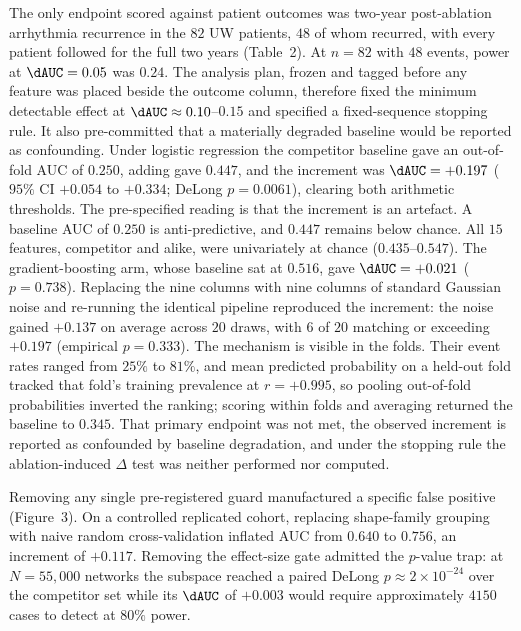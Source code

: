 The only endpoint scored against patient outcomes was two-year post-ablation
arrhythmia recurrence in the $82$ UW patients, $48$ of whom recurred, with every
patient followed for the full two years (Table~2). At $n=82$ with $48$ events,
power at $\dAUC=0.05$ was $0.24$. The analysis plan, frozen and tagged before any
feature was placed beside the outcome column, therefore fixed the minimum
detectable effect at $\dAUC\approx0.10$--$0.15$ and specified a fixed-sequence
stopping rule. It also pre-committed that a materially degraded baseline would be
reported as confounding. Under logistic
regression the competitor baseline gave an out-of-fold AUC of $0.250$, adding
\SFI{} gave $0.447$, and the increment was $\dAUC=+0.197$ ($95\%$ CI $+0.054$ to
$+0.334$; DeLong $p=0.0061$), clearing both arithmetic thresholds. The
pre-specified reading is that the increment is an artefact. A baseline AUC of
$0.250$ is anti-predictive, and $0.447$ remains below chance. All $15$ features,
competitor and \SFI{} alike, were univariately at chance ($0.435$--$0.547$). The
gradient-boosting arm, whose baseline sat at $0.516$, gave $\dAUC=+0.021$
($p=0.738$). Replacing the nine \SFI{} columns with nine columns of standard
Gaussian noise and re-running the identical pipeline reproduced the increment:
the noise gained $+0.137$ on
average across $20$ draws, with $6$ of $20$ matching or exceeding $+0.197$
(empirical $p=0.333$). The mechanism is visible in the folds. Their event rates
ranged from $25\%$ to $81\%$, and mean predicted probability on a held-out fold
tracked that fold's training prevalence at $r=+0.995$, so pooling out-of-fold
probabilities inverted the ranking; scoring within folds and averaging returned
the baseline to $0.345$. That primary endpoint was not met, the
observed increment is reported as confounded by baseline degradation, and under
the stopping rule the ablation-induced $\Delta$\SFI{} test was neither performed
nor computed.

Removing any single pre-registered guard manufactured a specific false positive
(Figure~3). On a controlled replicated cohort, replacing shape-family grouping
with naive random cross-validation inflated AUC from $0.640$ to $0.756$, an
increment of $+0.117$. Removing the effect-size gate admitted the $p$-value trap: at
$N=55{,}000$ networks the subspace \SFI{} reached a paired DeLong
$p\approx2\times10^{-24}$ over the competitor set while its $\dAUC$ of $+0.003$
would require approximately $4150$ cases to detect at $80\%$ power.
